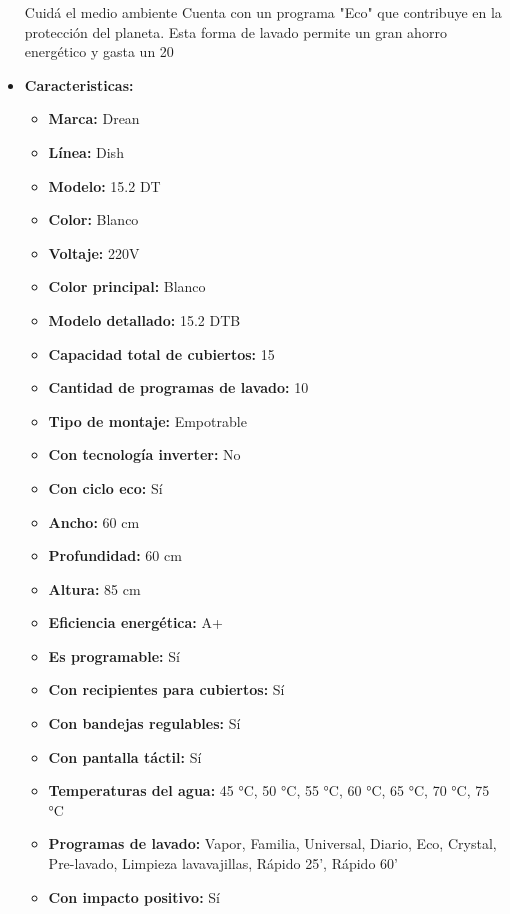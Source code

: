 \documentclass{article}
\begin{document}
\begin{adjustwidth}{2em}{}
\begin{itemize}
Cuidá el medio ambiente
Cuenta con un programa "Eco" que contribuye en la protección del planeta. Esta forma de lavado permite un gran ahorro energético y gasta un 20%
        \item \textbf{Caracteristicas:} 
        \begin{itemize}
            \item \textbf {Marca:} Drean
    \item \textbf {Línea:} Dish
    \item \textbf {Modelo:} 15.2 DT
    \item \textbf {Color:} Blanco
    \item \textbf {Voltaje:} 220V
    \item \textbf {Color principal:} Blanco
    \item \textbf {Modelo detallado:} 15.2 DTB
    \item \textbf {Capacidad total de cubiertos:} 15
    \item \textbf {Cantidad de programas de lavado:} 10
    \item \textbf {Tipo de montaje:} Empotrable
    \item \textbf {Con tecnología inverter:} No
    \item \textbf {Con ciclo eco:} Sí
    \item \textbf {Ancho:} 60 cm
    \item \textbf {Profundidad:} 60 cm
    \item \textbf {Altura:} 85 cm
    \item \textbf {Eficiencia energética:} A+
    \item \textbf {Es programable:} Sí
    \item \textbf {Con recipientes para cubiertos:} Sí
    \item \textbf {Con bandejas regulables:} Sí
    \item \textbf {Con pantalla táctil:} Sí
    \item \textbf {Temperaturas del agua:} 45 °C, 50 °C, 55 °C, 60 °C, 65 °C, 70 °C, 75 °C
    \item \textbf {Programas de lavado:} Vapor, Familia, Universal, Diario, Eco, Crystal, Pre-lavado, Limpieza lavavajillas, Rápido 25', Rápido 60'
    \item \textbf {Con impacto positivo:} Sí
        \end{itemize}
    \end{itemize}

    \vspace{1\baselineskip} %
    \end{adjustwidth}
\end{document}
